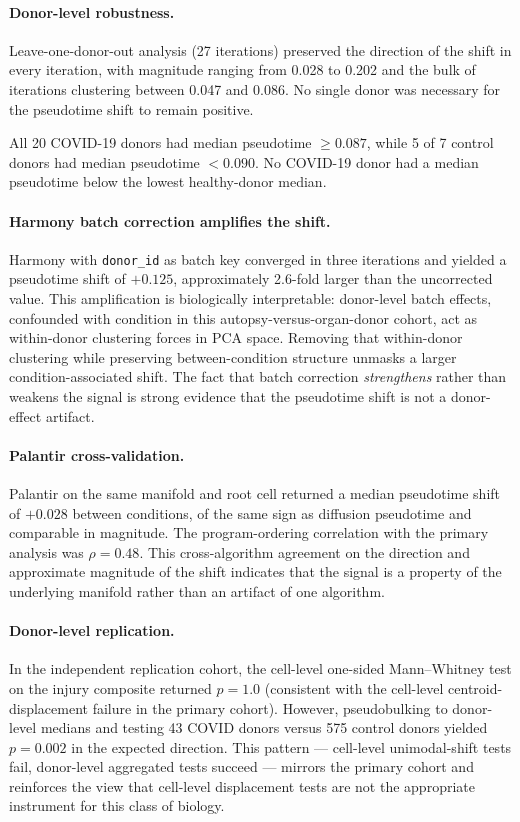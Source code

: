 \documentclass[11pt]{article}
\begin{document}
\paragraph{Donor-level robustness.} Leave-one-donor-out analysis (27 iterations) preserved the direction of the shift in every iteration, with magnitude ranging from 0.028 to 0.202 and the bulk of iterations clustering between 0.047 and 0.086. No single donor was necessary for the pseudotime shift to remain positive.

All 20 COVID-19 donors had median pseudotime $\geq 0.087$, while 5 of 7 control donors had median pseudotime $< 0.090$. No COVID-19 donor had a median pseudotime below the lowest healthy-donor median.

\paragraph{Harmony batch correction amplifies the shift.} Harmony \citep{Korsunsky2019} with \texttt{donor\_id} as batch key converged in three iterations and yielded a pseudotime shift of $+0.125$, approximately 2.6-fold larger than the uncorrected value. This amplification is biologically interpretable: donor-level batch effects, confounded with condition in this autopsy-versus-organ-donor cohort, act as within-donor clustering forces in PCA space. Removing that within-donor clustering while preserving between-condition structure unmasks a larger condition-associated shift. The fact that batch correction \emph{strengthens} rather than weakens the signal is strong evidence that the pseudotime shift is not a donor-effect artifact.

\paragraph{Palantir cross-validation.} Palantir \citep{Setty2019} on the same manifold and root cell returned a median pseudotime shift of $+0.028$ between conditions, of the same sign as diffusion pseudotime and comparable in magnitude. The program-ordering correlation with the primary analysis was $\rho = 0.48$. This cross-algorithm agreement on the direction and approximate magnitude of the shift indicates that the signal is a property of the underlying manifold rather than an artifact of one algorithm.

\paragraph{Donor-level replication.} In the independent replication cohort, the cell-level one-sided Mann--Whitney test on the injury composite returned $p = 1.0$ (consistent with the cell-level centroid-displacement failure in the primary cohort). However, pseudobulking to donor-level medians and testing 43 COVID donors versus 575 control donors yielded $p = 0.002$ in the expected direction. This pattern --- cell-level unimodal-shift tests fail, donor-level aggregated tests succeed --- mirrors the primary cohort and reinforces the view that cell-level displacement tests are not the appropriate instrument for this class of biology.
\end{document}
